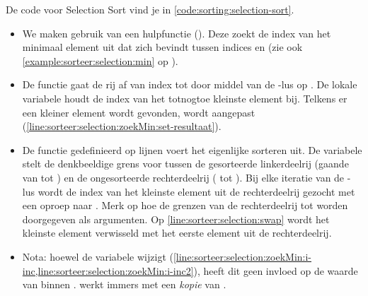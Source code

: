 
De code voor Selection Sort vind je in \cref{code:sorting:selection-sort}.
\begin{itemize}
  \item We maken gebruik van een hulpfunctie 
        ().
        Deze zoekt de index van het minimaal element uit  dat zich bevindt
        tussen indices  en  (zie ook \cref{example:sorteer:selection:min}
        op ).
  \item De functie  gaat de rij af
        van index  tot 
        door middel van de -lus op
        .
        De lokale variabele  houdt
        de index van het totnogtoe kleinste element bij.
        Telkens er een kleiner element wordt gevonden,
        wordt  aangepast (\cref{line:sorteer:selection:zoekMin:set-resultaat}).
  \item De functie  gedefinieerd op lijnen
        voert het eigenlijke sorteren uit.
        De variabele  stelt de denkbeeldige grens voor
        tussen de gesorteerde linkerdeelrij (gaande van  tot )
        en de ongesorteerde rechterdeelrij ( tot ).
        Bij elke iteratie van de -lus wordt de index van
        het kleinste element uit de rechterdeelrij gezocht
        met een oproep naar . Merk op hoe
        de grenzen van de rechterdeelrij  tot  worden doorgegeven
        als argumenten. Op \cref{line:sorteer:selection:swap} wordt het kleinste element
        verwisseld met het eerste element uit de rechterdeelrij.
  \item Nota: hoewel  de variabele 
        wijzigt (\cref{line:sorteer:selection:zoekMin:i-inc,line:sorteer:selection:zoekMin:i-inc2}),
        heeft dit geen invloed op de waarde van  binnen .
         werkt immers met een \emph{kopie} van .
\end{itemize}

